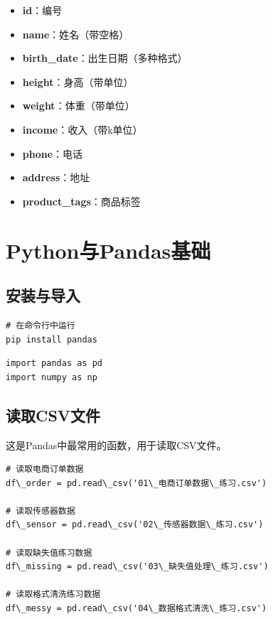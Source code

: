 \documentclass[12pt,a4paper]{article}
\begin{document}
\begin{knowledgebox}[数据字段说明]
\begin{itemize}
    \item \textbf{id}：编号
    \item \textbf{name}：姓名（带空格）
    \item \textbf{birth\_date}：出生日期（多种格式）
    \item \textbf{height}：身高（带单位）
    \item \textbf{weight}：体重（带单位）
    \item \textbf{income}：收入（带k单位）
    \item \textbf{phone}：电话
    \item \textbf{address}：地址
    \item \textbf{product\_tags}：商品标签
\end{itemize}
\end{knowledgebox}

\section{Python与Pandas基础}

\subsection{安装与导入}

\begin{lstlisting}[caption={安装Pandas}]
# 在命令行中运行
pip install pandas
\end{lstlisting}

\begin{lstlisting}[caption={导入Pandas}]
import pandas as pd
import numpy as np
\end{lstlisting}

\subsection{读取CSV文件}

\begin{knowledgebox}
这是Pandas中最常用的函数，用于读取CSV文件。
\end{knowledgebox}

\begin{lstlisting}[caption={读取四个练习文件}]
# 读取电商订单数据
df\_order = pd.read\_csv('01\_电商订单数据\_练习.csv')

# 读取传感器数据
df\_sensor = pd.read\_csv('02\_传感器数据\_练习.csv')

# 读取缺失值练习数据
df\_missing = pd.read\_csv('03\_缺失值处理\_练习.csv')

# 读取格式清洗练习数据
df\_messy = pd.read\_csv('04\_数据格式清洗\_练习.csv')
\end{lstlisting}
\end{document}
